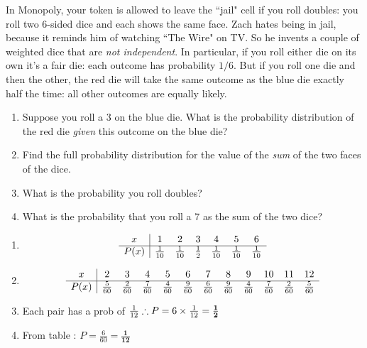 \documentclass[11pt]{amsart}
\newcommand{\be}{\begin{enumerate}}
\newcommand{\ee}{\end{enumerate}}
\begin{document}
\item In Monopoly, your token is allowed to leave the ``jail" cell if you roll doubles: you roll two 6-sided dice and each shows the same face.  Zach hates being in jail, because it reminds him of watching ``The Wire" on TV.  So he invents a couple of weighted dice that are \textit{not independent}.  In particular, if you roll either die on its own it's a fair die: each outcome has probability $1/6$.  But if you roll one die and then the other, the red die will take the same outcome as the blue die exactly half the time: all other outcomes are equally likely.

\be
\item Suppose you roll a 3 on the blue die.  What is the probability distribution of the red die \textit{given} this outcome on the blue die?
\item Find the full probability distribution for the value of the \textit{sum} of the two faces of the dice.
\item What is the probability you roll doubles?
\item What is the probability that you roll a 7 as the sum of the two dice?
\ee 
	\begin{sol}
		\be
			\item
			\begin{displaymath}
			\begin{array}{c| c c c c c c}
			x & 1 & 2 & 3 & 4 & 5 & 6\\
			\hline
			P(x) & \frac{1}{10} & \frac{1}{10} & \frac{1}{2} & \frac{1}{10} & \frac{1}{10} & \frac{1}{10}
			\end{array}
			\end{displaymath}

			\item
			\begin{displaymath}
			\begin{array}{c| c c c c c c c c c c c}
			x & 2 & 3 & 4 & 5 & 6 & 7 & 8 & 9 & 10 & 11 & 12\\
			\hline
			P(x) & \frac{5}{60} & \frac{2}{60} & \frac{7}{60} & \frac{4}{60} & \frac{9}{60} & \frac{6}{60} & \frac{9}{60} & \frac{4}{60} & \frac{7}{60} & \frac{2}{60} & \frac{5}{60}
			\end{array}
			\end{displaymath}

			\item Each pair has a prob of $\frac{1}{12}\\
			\therefore P = 6 \times \frac{1}{12} = \mathbf{\frac{1}{2}}$

			\item From table : $P = \frac{6}{60} = \mathbf{\frac{1}{12}}$
		\ee
	\end{sol}
\end{document}
